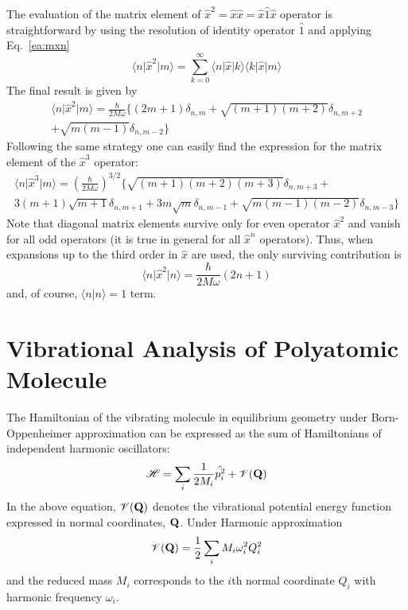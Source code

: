 \documentclass[b5paper,oneside,fleqn,11pt]{book}
\begin{document}
\begin{appendices}
The evaluation of the matrix element of $\hat{x}^2=\hat{x}\hat{x}=\hat{x}\hat{1}\hat{x}$ 
operator is straightforward
by using the resolution of identity operator $\hat{1}$ and applying Eq.~\eqref{ea:mxn}
%
\begin{equation}
\langle n \vert \hat{x}^2 \vert m \rangle = 
\sum_{k=0}^{\infty} \langle n \vert \hat{x} \vert k \rangle \langle k \vert \hat{x} \vert m \rangle
\end{equation}
%
The final result is given by
%
\begin{multline} \label{ea:mxxn}
\langle n \vert \hat{x}^2 \vert m \rangle = 
\frac{\hbar}{2M\omega}
\Big\{ 
   (2m+1) \delta_{n,m} + \sqrt{(m+1)(m+2)} \delta_{n,m+2}  \\ +
                         \sqrt{m(m-1)} \delta_{n,m-2}
\Big\}
\end{multline}
%
Following the same strategy one can easily find the expression for 
the matrix element of the $\hat{x}^3$ operator:
%
\begin{multline}
\label{ea:mxxxn}
\langle n \vert \hat{x}^3 \vert m \rangle = 
\left(
\frac{\hbar}{2M\omega}
\right)^{3/2}
\Big\{ 
   \sqrt{(m+1)(m+2)(m+3)} \delta_{n,m+3} + \\
   3(m+1)\sqrt{m+1} \delta_{n,m+1}
      +3m\sqrt{m}   \delta_{n,m-1} + \sqrt{m(m-1)(m-2)} \delta_{n,m-3}
\Big\}
\end{multline}
%
Note that diagonal matrix elements survive only for even operator $\hat{x}^2$
and vanish for all odd operators (it is true in general for all $\hat{x}^n$
operators). Thus, when expansions up to the third order in $\hat{x}$ are 
used, the only surviving contribution is
%
\begin{equation}
\label{ea:mxm}
\langle n \vert \hat{x}^2 \vert n \rangle = 
\frac{\hbar}{2M\omega}(2n+1)
\end{equation}
%
and, of course, $\langle n \vert n \rangle=1$ term.

\section{Vibrational Analysis of Polyatomic Molecule\label{asec:vibranal}}

The Hamiltonian of the vibrating molecule in equilibrium geometry under Born\hyp{}Oppenheimer approximation
can be expressed as the sum of Hamiltonians of independent harmonic oscillators:
\begin{equation}
\mathscr{H} = \sum_i \frac{1}{2M_i}\hat{{p}_i^2} + \mathscr{V}({\bf Q})
\end{equation}
In the above equation, $\mathscr{V}({\bf Q})$ denotes the vibrational potential energy function
expressed in normal coordinates, ${\bf Q}$. Under Harmonic approximation
\begin{equation}
\mathscr{V}({\bf Q}) = \frac{1}{2} \sum_i M_i \omega_i^2 Q_i^2
\end{equation}
and the reduced mass $M_i$ corresponds to the $i$th normal coordinate $Q_i$ with
harmonic frequency $\omega_i$.


\end{appendices}
\end{document}
